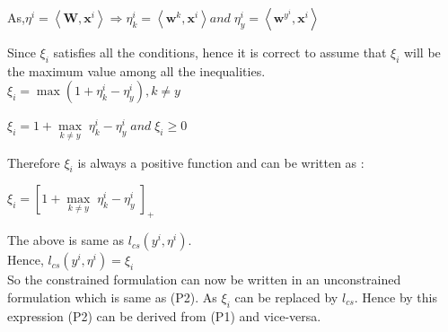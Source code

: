 \documentclass[a4paper,11pt]{article}
\begin{document}
\begin{mlsolution}
As,\begin{math} \eta ^{i} = \left \langle \textbf{W}, \textbf{x}^{i} \right \rangle \Rightarrow \eta_{k} ^{i} = \left \langle \textbf{w}^{k}, \textbf{x}^{i} \right \rangle  and \;\eta_{y} ^{i} = \left \langle \textbf{w}^{y^{i}}, \textbf{x}^{i} \right \rangle \end{math}

Since \begin{math} \xi_{i}\end{math} satisfies all the conditions, hence it is correct to assume that \begin{math} \xi_{i}\end{math} will be the maximum value among all the inequalities.\\

\begin{math}\xi_{i} = \max \left ( 1 + \eta_{k}^{i} - \eta_{y} ^{i} \right ), k\neq y\end{math}

\begin{math}\xi_{i} =   1 + \underset{k\neq y}{\max} \;\eta_{k}^{i} - \eta_{y} ^{i}  \;and\; \xi_{i}\geq 0\end{math}

Therefore \begin{math} \xi_{i}\end{math} is always a positive function and can be written as :

\begin{math}\xi_{i} =   \left [  1 + \underset{k\neq y}{\max} \;\eta_{k}^{i} - \eta_{y} ^{i}\;\right ]_{+}\end{math}

The above is same as \begin{math} l_{cs}\left ( y^{i},\eta ^{i} \right ) \end{math}.\\ 

Hence, \begin{math} l_{cs}\left ( y^{i},\eta ^{i} \right ) = \xi _{i} \end{math}\\

So the constrained formulation can now be written in an unconstrained formulation which is same as (P2). As \begin{math} \xi _{i} \end{math} can be replaced by \begin{math} l_{cs}\end{math}. Hence by this expression (P2) can be derived from (P1) and vice-versa.


\end{mlsolution}
\end{document}

